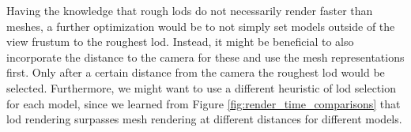 Having the knowledge that rough \acsp{lod} do not necessarily render faster than meshes, a further optimization would be to not simply set models outside of the view frustum to the roughest \ac{lod}.
Instead, it might be beneficial to also incorporate the distance to the camera for these and use the mesh representations first.
Only after a certain distance from the camera the roughest \ac{lod} would be selected.
Furthermore, we might want to use a different heuristic of \ac{lod} selection for each model, since we learned from Figure \ref{fig:render_time_comparisons} that \ac{lod} rendering surpasses mesh rendering at different distances for different models.